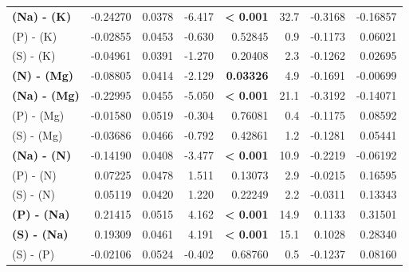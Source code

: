 \begin{table}[H]
\begin{tabular}[t]{>{}lrrr>{}rrrr}
\textbf{(Na) - (K)} & -0.24270 & 0.0378 & -6.417 & \textbf{< 0.001} & 32.7 & -0.3168 & -0.16857\\
(P) - (K) & -0.02855 & 0.0453 & -0.630 & 0.52845 & 0.9 & -0.1173 & 0.06021\\
(S) - (K) & -0.04961 & 0.0391 & -1.270 & 0.20408 & 2.3 & -0.1262 & 0.02695\\
\textbf{(N) - (Mg)} & -0.08805 & 0.0414 & -2.129 & \textbf{0.03326} & 4.9 & -0.1691 & -0.00699\\
\textbf{(Na) - (Mg)} & -0.22995 & 0.0455 & -5.050 & \textbf{< 0.001} & 21.1 & -0.3192 & -0.14071\\
(P) - (Mg) & -0.01580 & 0.0519 & -0.304 & 0.76081 & 0.4 & -0.1175 & 0.08592\\
(S) - (Mg) & -0.03686 & 0.0466 & -0.792 & 0.42861 & 1.2 & -0.1281 & 0.05441\\
\textbf{(Na) - (N)} & -0.14190 & 0.0408 & -3.477 & \textbf{< 0.001} & 10.9 & -0.2219 & -0.06192\\
(P) - (N) & 0.07225 & 0.0478 & 1.511 & 0.13073 & 2.9 & -0.0215 & 0.16595\\
(S) - (N) & 0.05119 & 0.0420 & 1.220 & 0.22249 & 2.2 & -0.0311 & 0.13343\\
\textbf{(P) - (Na)} & 0.21415 & 0.0515 & 4.162 & \textbf{< 0.001} & 14.9 & 0.1133 & 0.31501\\
\textbf{(S) - (Na)} & 0.19309 & 0.0461 & 4.191 & \textbf{< 0.001} & 15.1 & 0.1028 & 0.28340\\
(S) - (P) & -0.02106 & 0.0524 & -0.402 & 0.68760 & 0.5 & -0.1237 & 0.08160\\
\bottomrule
\end{tabular}
\end{table}
